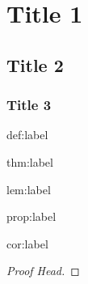\documentclass{package/notes}
\begin{document}
\chapter{Title 1}

\section{Title 2}
\subsection{Title 3}

\begin{definition}{def:label} %
	\lipsum[1][1-3]
\end{definition}

\begin{theorem}{thm:label}%
	\lipsum[2][1-3]
\end{theorem}

\begin{lemma}{lem:label}%
	\lipsum[3][1-3]
\end{lemma}

\begin{proposition}{prop:label}%
	\lipsum[4][1-3]
\end{proposition}

\begin{corollary}{cor:label}%
	\lipsum[5][1-3]
\end{corollary}

\begin{problem}%
	\lipsum[1][1-3]
\end{problem}
\begin{proof}[Proof Head]
	\lipsum[1][1-10]
\end{proof}
\end{document}
